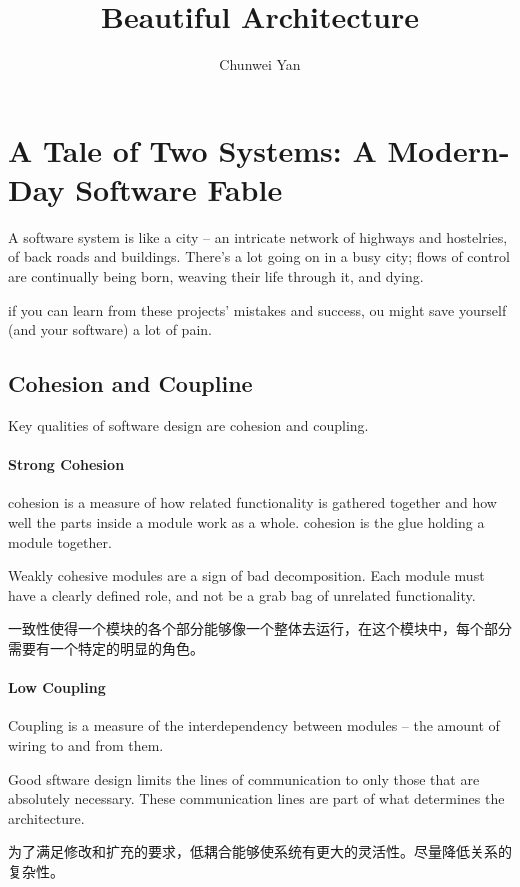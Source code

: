 \documentclass[a4paper]{article}
\author{Chunwei Yan}
\title{Beautiful Architecture}
\begin{document}
    \maketitle
\section{A Tale of Two Systems: A Modern-Day Software Fable}

A software system is like a city -- an intricate network of highways and hostelries, of back roads and buildings.
There's a lot going on in a busy city; flows of control are continually being born, weaving their life through it, and dying.
\par 
if you can learn from these projects' mistakes and success, ou might save yourself (and your software) a lot of pain.

\subsection{Cohesion and Coupline}
Key qualities of software design are cohesion and coupling.
\paragraph{Strong Cohesion}
\par cohesion is a measure of how related functionality is gathered together and how well the parts inside a module work as a whole. cohesion is the glue holding a module together.
\par Weakly cohesive modules are a sign of bad decomposition. Each module must have a clearly defined role, and not be a grab bag of unrelated functionality.
\par 一致性使得一个模块的各个部分能够像一个整体去运行，在这个模块中，每个部分需要有一个特定的明显的角色。
\paragraph{Low Coupling}
Coupling is a measure of the interdependency between modules -- the amount of wiring to and from them.
\par Good sftware design limits the lines of communication to only those that are absolutely necessary. These communication lines are part of what determines the architecture.
\par 为了满足修改和扩充的要求，低耦合能够使系统有更大的灵活性。尽量降低关系的复杂性。
\\
\end{document}
